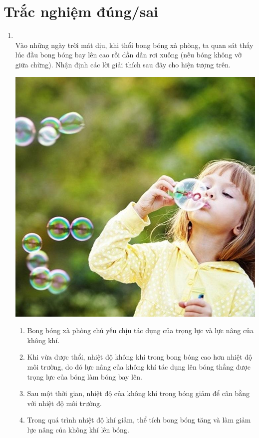 \section{Trắc nghiệm đúng/sai}
\begin{enumerate}[label=\bfseries Câu \arabic*:, leftmargin=1.7cm]
	\item {}\\
	Vào những ngày trời mát dịu, khi thổi bong bóng xà phòng, ta quan sát thấy lúc đầu bong bóng bay lên cao rồi dần dần rơi xuống (nếu bóng không vỡ giữa chừng). Nhận định các lời giải thích sau đây cho hiện tượng trên.
	\begin{center}
		\includegraphics[width=0.35\linewidth]{../figs/VN12-Y24-PH-SYL-011P-1}
	\end{center}
	\begin{enumerate}[label=\alph*)]
		\item Bong bóng xà phòng chủ yếu chịu tác dụng của trọng lực và lực nâng của không khí.
		\item Khi vừa được thổi, nhiệt độ không khí trong bong bóng cao hơn nhiệt độ môi trường, do đó lực nâng của không khí tác dụng lên bóng thắng được trọng lực của bóng làm bóng bay lên.
		\item Sau một thời gian, nhiệt độ của không khí trong bóng giảm để cân bằng với nhiệt độ môi trường.
		\item Trong quá trình nhiệt độ khí giảm, thể tích bong bóng tăng và làm giảm lực nâng của không khí lên bóng.
	\end{enumerate}


\end{enumerate}
